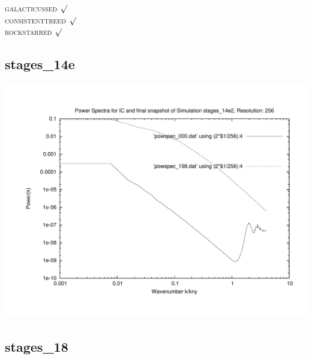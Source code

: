 \textsc{galacticussed} $\surd$ \\
\textsc{consistenttreed} $\surd$ \\ 
\textsc{rockstarred} $\surd$
% 
%
%
%
%
%
%
%

\newpage
\subsection{stages\_14e}
\includegraphics[scale=0.5]{r256/stages_14e2/plot_powspec_stages_14e2}

% 
%
%
%
%
%
%
%




\newpage
\subsection{stages\_18}

